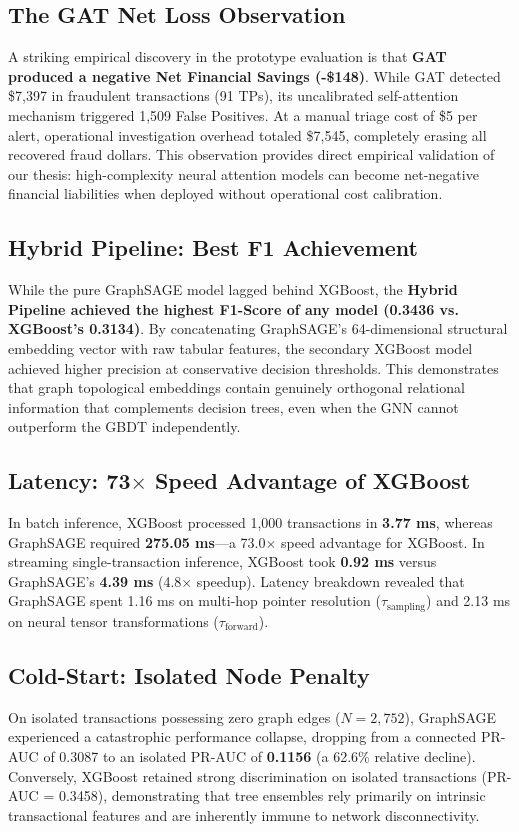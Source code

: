 \documentclass[11pt,a4paper]{report}
\begin{document}
\subsection{The GAT Net Loss Observation}
A striking empirical discovery in the prototype evaluation is that \textbf{GAT produced a negative Net Financial Savings (-\$148)}. 
While GAT detected \$7,397 in fraudulent transactions (91 TPs), its uncalibrated self-attention mechanism triggered 1,509 False Positives. At a manual triage cost of \$5 per alert, operational investigation overhead totaled \$7,545, completely erasing all recovered fraud dollars. This observation provides direct empirical validation of our thesis: high-complexity neural attention models can become net-negative financial liabilities when deployed without operational cost calibration.

\subsection{Hybrid Pipeline: Best F1 Achievement}
While the pure GraphSAGE model lagged behind XGBoost, the \textbf{Hybrid Pipeline achieved the highest F1-Score of any model (0.3436 vs. XGBoost's 0.3134)}. 
By concatenating GraphSAGE's 64-dimensional structural embedding vector with raw tabular features, the secondary XGBoost model achieved higher precision at conservative decision thresholds. This demonstrates that graph topological embeddings contain genuinely orthogonal relational information that complements decision trees, even when the GNN cannot outperform the GBDT independently.

\subsection{Latency: 73$\times$ Speed Advantage of XGBoost}
In batch inference, XGBoost processed 1,000 transactions in \textbf{3.77 ms}, whereas GraphSAGE required \textbf{275.05 ms}---a 73.0$\times$ speed advantage for XGBoost. 
In streaming single-transaction inference, XGBoost took \textbf{0.92 ms} versus GraphSAGE's \textbf{4.39 ms} (4.8$\times$ speedup). Latency breakdown revealed that GraphSAGE spent 1.16 ms on multi-hop pointer resolution ($\tau_{\text{sampling}}$) and 2.13 ms on neural tensor transformations ($\tau_{\text{forward}}$).

\subsection{Cold-Start: Isolated Node Penalty}
On isolated transactions possessing zero graph edges ($N = 2,752$), GraphSAGE experienced a catastrophic performance collapse, dropping from a connected PR-AUC of 0.3087 to an isolated PR-AUC of \textbf{0.1156} (a 62.6\% relative decline). Conversely, XGBoost retained strong discrimination on isolated transactions (PR-AUC = 0.3458), demonstrating that tree ensembles rely primarily on intrinsic transactional features and are inherently immune to network disconnectivity.
\end{document}
